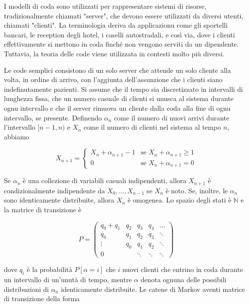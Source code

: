 \documentclass[11pt]{article}
\newcommand{\N}{\mathbb{N}}
\begin{document}
I modelli di coda sono utilizzati per rappresentare sistemi di risorse, tradizionalmente chiamati "server", che devono essere utilizzati da diversi utenti, chiamati "clienti". La terminologia deriva da applicazionu come gli sportelli bancari, le reception degli hotel, i caselli autostradali, e così via, dove i clienti effettivamente si mettono in coda finché non vengono serviti da un dipendente. Tuttavia, la teoria delle code viene utilizzata in contesti molto più diversi. \vspace*{0.4cm}

\noindent Le code semplici consistono di un solo server che attende un solo cliente alla volta, in ordine di arrivo, con l'aggiunta dell'assunzione che i clienti siano indefinutamente pazienti. Si assume che il tempo sia discretizzato in intervalli di lunghezza fissa, che un numero casuale di clienti si unusca al sistema durante ognu intervallo e che il server rimuova un cliente dalla coda alla fine di ognu intervallo, se presente. Definendo $\alpha_n$ come il numero di nuovi arrivi durante l'intervallo $[n - 1, n)$ e $X_n$ come il numero di clienti nel sistema al tempo $n$, abbiamo

\begin{equation}
    X_{n+1} =
    \begin{cases}
        X_n + \alpha_{n+1} - 1 & \text{se } X_n + \alpha_{n+1} \geq 1 \\
        0 & \text{se } X_n + \alpha_{n+1} = 0
    \end{cases}
\end{equation}

\noindent Se ${\alpha_n}$ è una collezione di variabili casuali indipendenti, allora $X_{n+1}$ è condizionalmente indipendente da $X_0, \ldots, X_{n-1}$ se $X_n$ è noto. Se, inoltre, le $\alpha_n$ sono identicamente distribuite, allora ${X_n}$ è omogenea. Lo spazio degli stati è $\N$ e la matrice di transizione è

\begin{equation}
    P = \begin{pmatrix}
        q_0 + q_1 & q_2 & q_3 & q_4 & \ldots \\
        q_0 & q_1 & q_2 & q_3 & \ddots \\
        \vdots & q_0 & q_1 & q_2 & \ddots \\
        0 &  & \ddots & \ddots & \ddots
    \end{pmatrix}
\end{equation}

\noindent dove $q_i$ è la probabilità $P[\alpha=i]$ che $i$ nuovi clienti che entrino in coda durante un intervallo di un'unutà di tempo, mentre $\alpha$ denota ognuna delle possibili distribuzioni di $\alpha_n$ identicamente distribuite. Le catene di Markov aventi matrice di transizione della forma
\end{document}
